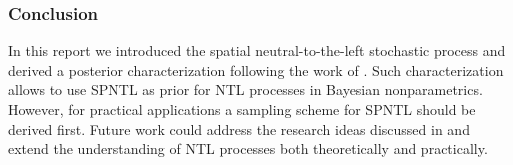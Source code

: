 \subsubsection{Conclusion}\label{conclusion}
In this report we introduced the spatial neutral-to-the-left stochastic process and derived a posterior characterization following the work of \cite{james2006poisson}. Such characterization allows to use SPNTL as prior for NTL processes in Bayesian nonparametrics. However, for practical applications a sampling scheme for SPNTL should be derived first. Future work could address the research ideas discussed in  and extend the understanding of NTL processes both theoretically and practically.
